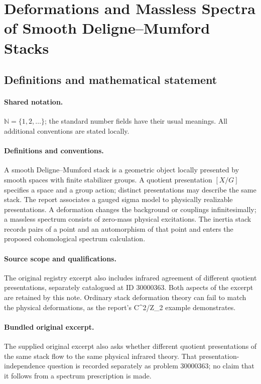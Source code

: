 \documentclass[11pt]{article}
\begin{document}
\section{Deformations and Massless Spectra of Smooth Deligne–Mumford Stacks}\label{statement}

\subsection{Definitions and mathematical statement}

\paragraph{Shared notation.}$\mathbb N=\{1,2,\ldots\}$; the standard number fields have their usual meanings. All additional conventions are stated locally.


\paragraph{Definitions and conventions.} A smooth Deligne--Mumford stack is a geometric object locally presented by smooth spaces with finite stabilizer groups. A quotient presentation $[X/G]$ specifies a space and a group action; distinct presentations may describe the same stack. The report associates a gauged sigma model to physically realizable presentations. A deformation changes the background or couplings infinitesimally; a massless spectrum consists of zero-mass physical excitations. The inertia stack records pairs of a point and an automorphism of that point and enters the proposed cohomological spectrum calculation.

\paragraph{Source scope and qualifications.} The original registry excerpt also includes infrared agreement of different quotient presentations, separately catalogued at ID 30000363. Both aspects of the excerpt are retained by this note. Ordinary stack deformation theory can fail to match the physical deformations, as the report's C^2/Z\_2 example demonstrates.

\paragraph{Bundled original excerpt.} The supplied original excerpt also asks whether different quotient presentations of the same stack flow to the same physical infrared theory. That presentation-independence question is recorded separately as problem 30000363; no claim that it follows from a spectrum prescription is made.
\end{document}
